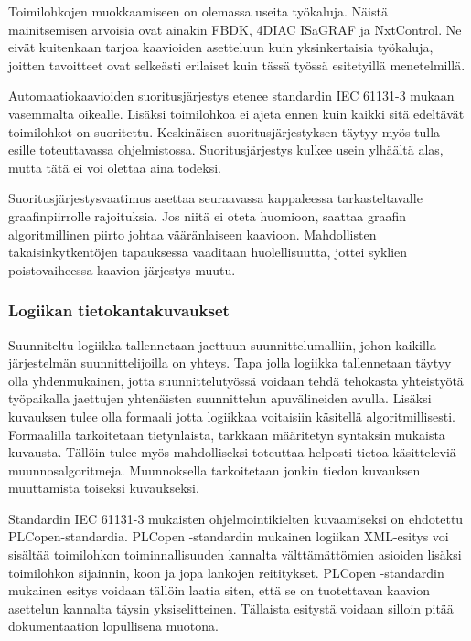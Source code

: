\documentclass[finnish,12pt]{article}
\begin{document}
Toimilohkojen muokkaamiseen on olemassa useita työkaluja.
Näistä mainitsemisen arvoisia ovat ainakin FBDK, 4DIAC ISaGRAF ja NxtControl.
Ne eivät kuitenkaan tarjoa kaavioiden asetteluun kuin yksinkertaisia työkaluja, joitten tavoitteet ovat selkeästi erilaiset kuin tässä työssä esitetyillä menetelmillä.

Automaatiokaavioiden suoritusjärjestys etenee standardin IEC 61131-3 mukaan vasemmalta oikealle.
Lisäksi toimilohkoa ei ajeta ennen kuin kaikki sitä edeltävät toimilohkot on suoritettu.
Keskinäisen suoritusjärjestyksen täytyy myös tulla esille toteuttavassa ohjelmistossa.
Suoritusjärjestys kulkee usein ylhäältä alas, mutta tätä ei voi olettaa aina todeksi. \cite{RefWorks:62}

Suoritusjärjestysvaatimus asettaa seuraavassa kappaleessa tarkasteltavalle graafinpiirrolle rajoituksia.
Jos niitä ei oteta huomioon, saattaa graafin algoritmillinen piirto johtaa vääränlaiseen kaavioon.
Mahdollisten takaisinkytkentöjen tapauksessa vaaditaan huolellisuutta, jottei syklien poistovaiheessa kaavion järjestys muutu.


		\subsubsection{Logiikan tietokantakuvaukset}

Suunniteltu logiikka tallennetaan jaettuun suunnittelumalliin, johon kaikilla järjestelmän suunnittelijoilla on yhteys.
Tapa jolla logiikka tallennetaan täytyy olla yhdenmukainen, jotta suunnittelutyössä voidaan tehdä tehokasta yhteistyötä työpaikalla jaettujen yhtenäisten suunnittelun apuvälineiden avulla.
Lisäksi kuvauksen tulee olla formaali jotta logiikkaa voitaisiin käsitellä algoritmillisesti.
Formaalilla tarkoitetaan tietynlaista, tarkkaan määritetyn syntaksin mukaista kuvausta.
Tällöin tulee myös mahdolliseksi toteuttaa helposti tietoa käsitteleviä muunnosalgoritmeja.
Muunnoksella tarkoitetaan jonkin tiedon kuvauksen muuttamista toiseksi kuvaukseksi.

Standardin IEC 61131-3 mukaisten ohjelmointikielten kuvaamiseksi on ehdotettu PLCopen-standardia.
PLCopen -standardin mukainen logiikan XML-esitys voi sisältää toimilohkon toiminnallisuuden kannalta välttämättömien asioiden lisäksi toimilohkon sijainnin, koon ja jopa lankojen reititykset.
PLCopen -standardin mukainen esitys voidaan tällöin laatia siten, että se on tuotettavan kaavion asettelun kannalta täysin yksiselitteinen.
Tällaista esitystä voidaan silloin pitää dokumentaation lopullisena muotona. \cite{RefWorks:64}
\end{document}
